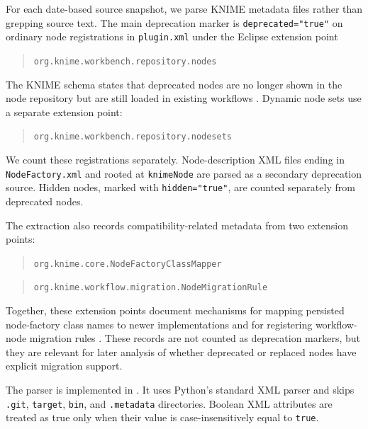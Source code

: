 \documentclass[runningheads]{llncs}
\begin{document}
For each date-based source snapshot, we parse KNIME metadata files rather than
grepping source text. The main deprecation marker is
\texttt{deprecated="true"} on ordinary node registrations in
\texttt{plugin.xml} under the Eclipse extension point
\begin{quote}
\texttt{org.knime.workbench.repository.nodes}
\end{quote}
The KNIME schema states that deprecated nodes are no longer shown in the node
repository but are still loaded in existing workflows
\cite{KNIMEWorkbenchNodeSchema2026}. Dynamic node sets use a separate
extension point:
\begin{quote}
\texttt{org.knime.workbench.repository.nodesets}
\end{quote}
We count these registrations separately. Node-description XML files ending in
\texttt{NodeFactory.xml} and rooted at \texttt{knimeNode} are parsed as a
secondary deprecation source.
Hidden nodes, marked with \texttt{hidden="true"}, are counted separately from
deprecated nodes.

The extraction also records compatibility-related metadata from two extension
points:
\begin{quote}
\texttt{org.knime.core.NodeFactoryClassMapper}
\end{quote}
\begin{quote}
\texttt{org.knime.workflow.migration.NodeMigrationRule}
\end{quote}
Together, these extension points document mechanisms for mapping persisted
node-factory class names to newer implementations and for registering
workflow-node migration rules
\cite{KNIMECoreClassMapperSchema2026,KNIMEMigrationRuleSchema2026}. These
records are not counted as deprecation markers, but they are relevant for later
analysis of whether deprecated or replaced nodes have explicit migration
support.

The parser is implemented in
.
It uses Python's standard XML parser and skips \texttt{.git},
\texttt{target}, \texttt{bin}, and \texttt{.metadata} directories. Boolean XML
attributes are treated as true only when their value is case-insensitively
equal to \texttt{true}.
\end{document}
